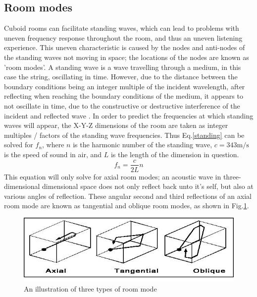 \documentclass[10pt, twocolumn]{article}
\begin{document}
        \subsection{Room modes}
        Cuboid rooms can facilitate standing waves, which can lead to problems with uneven frequency response throughout the room, and thus an uneven listening experience.
        This uneven characteristic is caused by the nodes and anti-nodes of the standing waves not moving in space; the locations of the nodes are known as 'room modes'.
        A standing wave is a wave travelling through a medium, in this case the string, oscillating in time.
        However, due to the distance between the boundary conditions being an integer multiple of the incident wavelength, after reflecting when reaching the boundary conditions of the medium, it appears to not oscillate in time, due to the constructive or destructive interference of the incident and reflected wave \cite{PHYS15}.
        In order to predict the frequencies at which standing waves will appear, the X-Y-Z dimensions of the room are taken as integer multiples / factors of the standing wave frequencies.
        Thus Eq.\ref{standing} can be solved for $f_n$, where $n$ is the harmonic number of the standing wave, $c=343\si{\meter\per\second}$ is the speed of sound in air, and $L$ is the length of the dimension in question.
        \begin{equation}\label{standing}
            f_n = \frac{c}{2L}n
        \end{equation}
        This equation will only solve for axial room modes; an acoustic wave in three-dimensional dimensional space does not only reflect back unto it's self, but also at various angles of reflection.
        These angular second and third reflections of an axial room mode are known as tangential and oblique room modes, as shown in Fig.\ref{oblique}.
        \begin{figure}[H]
            \includegraphics[scale=0.375]{resources/oblique.jpg}
            \caption{An illustration of three types of room mode \cite{MODES}}
            \label{oblique}
            \centering
        \end{figure}
\end{document}
